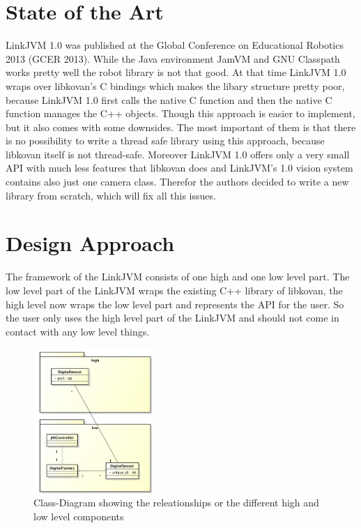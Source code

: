 \documentclass{juniorjournal}
\begin{document}
\section{State of the Art}
LinkJVM 1.0\cite{linkjvm1.0} was published at the Global Conference on Educational Robotics 2013 (GCER\cite{GCER} 2013).
While the Java environment JamVM and GNU Classpath\cite{GNU} works pretty well the robot library is not that good.
At that time LinkJVM 1.0 wraps over libkovan's\cite{libkovan} C bindings which makes the libary structure pretty poor, because LinkJVM 1.0 first calls the native C function and then the native C function manages the C++ objects.
Though this approach is easier to implement, but it also comes with some downsides.
The most important of them is that there is no possibility to write a thread safe library using this approach, because libkovan itself is not thread-safe.
Moreover LinkJVM 1.0 offers only a very small API with much less features that libkovan does and LinkJVM's 1.0 vision system contains also just one camera class.
Therefor the authors decided to write a new library from scratch, which will fix all this issues.

\section{Design Approach}
\label{sec:design-approach}
The framework of the LinkJVM consists of one high and one low level part.
The low level part of the LinkJVM wraps the existing C++ library of libkovan,
the high level now wraps the low level part and represents the API for the user.
So the user only uses the high level part of the LinkJVM and should not come in
contact with any low level things.

\begin{figure}[H]
\centering
\includegraphics[width=0.4\textwidth]{images/Class-Diagram.pdf}
\caption{Class-Diagram showing the releationships or the different high and low level components}
\label{fig:Class-Diagram}
\end{figure}
\end{document}
